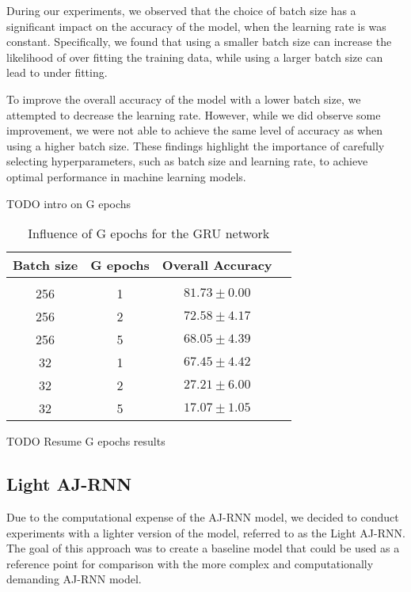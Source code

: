 During our experiments, we observed that the choice of batch size has a significant impact on the accuracy of the model, when the learning rate is was constant.
Specifically, we found that using a smaller batch size can increase the likelihood of over fitting the training data, while using a larger batch size can lead to under fitting.

To improve the overall accuracy of the model with a lower batch size, we attempted to decrease the learning rate.
However, while we did observe some improvement, we were not able to achieve the same level of accuracy as when using a higher batch size.
These findings highlight the importance of carefully selecting hyperparameters, such as batch size and learning rate, to achieve optimal performance in machine learning models.


TODO intro on G epochs

\begin{table}[!htbp]
  \centering
  \begin{tabular}{cccr} 
      Batch size & G epochs & Overall Accuracy\\[0.2cm] 
      \hline \\[-0.2cm]
      256 &   1 &  $81.73 \pm 0.00$\\
      256 &   2 &  $72.58 \pm 4.17$\\
      256 &   5 &  $68.05 \pm 4.39$\\
      32  &   1 &  $67.45 \pm 4.42$\\
      32  &   2 &  $27.21 \pm 6.00$\\
      32  &   5 &  $17.07 \pm 1.05$\\
  \end{tabular}
  \caption{Influence of G epochs for the GRU network}
  \label{tab:AJRNNGepochs}
\end{table}

TODO Resume G epochs results


\pagebreak
\subsection{Light AJ-RNN}

Due to the computational expense of the AJ-RNN model, we decided to conduct experiments with a lighter version of the model, referred to as the Light AJ-RNN.
The goal of this approach was to create a baseline model that could be used as a reference point for comparison with the more complex and computationally demanding AJ-RNN model. 

